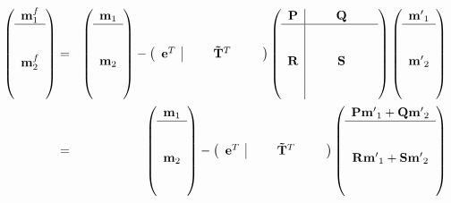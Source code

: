 \documentclass{article}
\begin{document}
\begin{eqnarray*}
	\left(\begin{array}{c}
		\mathbf{m}^f_1\\ \hline\\ {}\\ \mathbf{m}^f_2\\ {}\\ {}
	\end{array} \right) &=& 
	\left(\begin{array}{c}
		\mathbf{m}_1\\ \hline\\ {}\\ \mathbf{m}_2\\ {}\\ {}
	\end{array} \right) -
	\left(\begin{array}{c|ccc} 
		\mathbf{e}^T & \quad & \mathbf{\tilde{T}}^T & \quad 
	\end{array} \right)
	\left(\begin{array}{c|ccc}
		\mathbf{P} & {\quad } & \mathbf{Q} & {\quad } \\
		\hline\\
		{} & {} & {}\\
		\mathbf{R} & {\quad } & \mathbf{S} &
		{\quad }\\ 
		{} & {} & {}\\
		{} & {} & {}\\
	\end{array}\right)
	\left(\begin{array}{c}
		\mathbf{m'}_1\\ \hline\\ {}\\ \mathbf{m'}_2\\ {}\\ {}
	\end{array} \right)\\
	&=& 
	\left(\begin{array}{c}
		\mathbf{m}_1\\ \hline\\ {}\\ \mathbf{m}_2\\ {}\\ {}
	\end{array} \right) -
	\left(\begin{array}{c|ccc} 
		\mathbf{e}^T & \quad & \mathbf{\tilde{T}}^T & \quad 
	\end{array} \right)
	\left(\begin{array}{c}
		\mathbf{P}\mathbf{m'}_1+\mathbf{Q}\mathbf{m'}_2\\ \hline\\ {}\\ 
		\mathbf{R}\mathbf{m'}_1+\mathbf{S}\mathbf{m'}_2\\ {}\\ {}
	\end{array} \right)
\end{eqnarray*}
\end{document}
